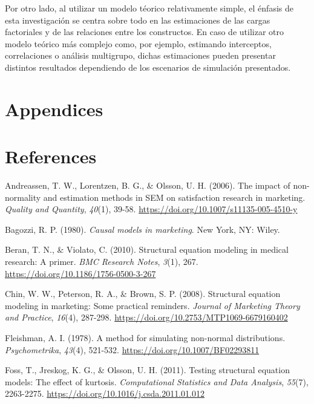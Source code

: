 \documentclass[
  english]{revcoles}
\begin{document}
Por otro lado, al utilizar un modelo téorico relativamente simple, el
énfasis de esta investigación se centra sobre todo en las estimaciones
de las cargas factoriales y de las relaciones entre los constructos. En
caso de utilizar otro modelo teórico más complejo como, por ejemplo,
estimando interceptos, correlaciones o análisis multigrupo, dichas
estimaciones pueden presentar distintos resultados dependiendo de los
escenarios de simulación presentados.

\section{Appendices}

\section*{References}

\hypertarget{refs}{}
\leavevmode\hypertarget{ref-Andreassen2006}{}%
Andreassen, T. W., Lorentzen, B. G., \& Olsson, U. H. (2006). The impact
of non-normality and estimation methods in SEM on satisfaction research
in marketing. \emph{Quality and Quantity}, \emph{40}(1), 39-58.
\url{https://doi.org/10.1007/s11135-005-4510-y}

\leavevmode\hypertarget{ref-Bagozzi1980}{}%
Bagozzi, R. P. (1980). \emph{Causal models in marketing}. New York, NY:
Wiley.

\leavevmode\hypertarget{ref-Beran2010}{}%
Beran, T. N., \& Violato, C. (2010). Structural equation modeling in
medical research: A primer. \emph{BMC Research Notes}, \emph{3}(1), 267.
\url{https://doi.org/10.1186/1756-0500-3-267}

\leavevmode\hypertarget{ref-Chin2008}{}%
Chin, W. W., Peterson, R. A., \& Brown, S. P. (2008). Structural
equation modeling in marketing: Some practical reminders. \emph{Journal
of Marketing Theory and Practice}, \emph{16}(4), 287-298.
\url{https://doi.org/10.2753/MTP1069-6679160402}

\leavevmode\hypertarget{ref-Fleishman1978}{}%
Fleishman, A. I. (1978). A method for simulating non-normal
distributions. \emph{Psychometrika}, \emph{43}(4), 521-532.
\url{https://doi.org/10.1007/BF02293811}

\leavevmode\hypertarget{ref-Foss2011}{}%
Foss, T., Jreskog, K. G., \& Olsson, U. H. (2011). Testing structural
equation models: The effect of kurtosis. \emph{Computational Statistics
and Data Analysis}, \emph{55}(7), 2263-2275.
\url{https://doi.org/10.1016/j.csda.2011.01.012}
\end{document}
